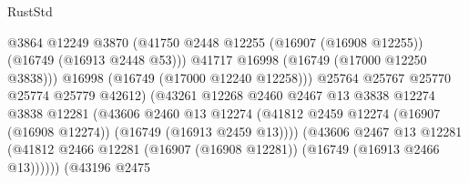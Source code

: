 \begin{lexlean}{RustStd}
\begin{coremodule}
                                              @3864
                                              @12249
                                              @3870
                                              (@41750
                                                @2448
                                                @12255
                                                (@16907 (@16908 @12255))
                                                (@16749 (@16913 @2448 @53)))
                                              @41717
                                              @16998
                                              (@16749 (@17000 @12250 @3838)))
                                            @16998
                                            (@16749 (@17000 @12240 @12258)))
                                          @25764
                                          @25767
                                          @25770
                                          @25774
                                          @25779
                                          @42612)
                                        (@43261
                                          @12268
                                          @2460
                                          @2467
                                          @13
                                          @3838
                                          @12274
                                          @3838
                                          @12281
                                          (@43606
                                            @2460
                                            @13
                                            @12274
                                            (@41812
                                              @2459
                                              @12274
                                              (@16907 (@16908 @12274))
                                              (@16749 (@16913 @2459 @13))))
                                          (@43606
                                            @2467
                                            @13
                                            @12281
                                            (@41812
                                              @2466
                                              @12281
                                              (@16907 (@16908 @12281))
                                              (@16749 (@16913 @2466 @13))))))
                                      (@43196
                                        @2475

\end{coremodule}
\end{lexlean}
